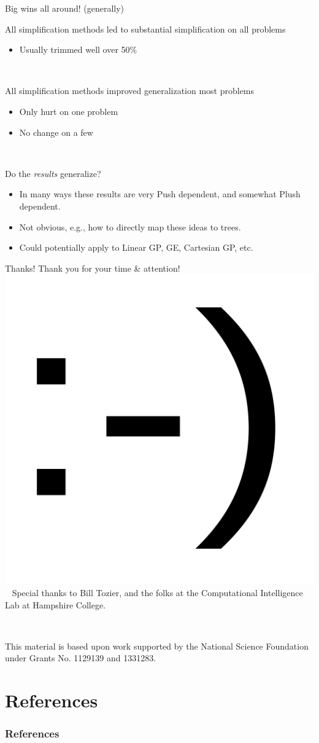 \documentclass{beamer}
\begin{document}
\begin{frame}{Big wins all around! (generally)}

All simplification methods led to substantial simplification on all problems
\begin{itemize}
	\item Usually trimmed well over 50\%
\end{itemize}

~

All simplification methods improved generalization most problems
\begin{itemize}
	\item Only hurt on one problem
	\item No change on a few
\end{itemize}

~

Do the \emph{results} generalize?
\begin{itemize}
	\item In many ways these results are very Push dependent, and somewhat Plush dependent.
	\item Not obvious, e.g., how to directly map these ideas to trees.
	\item Could potentially apply to Linear GP, GE, Cartesian GP, etc.
\end{itemize}


\end{frame}

\begin{frame}{Thanks!}
\center \Large
Thank you for your time \& attention! \\ \medskip
\includegraphics[width=.1\textwidth]{Illustrations/smile.png} \\ \medskip
\normalsize
~
Special thanks to Bill Tozier, and the folks at the Computational Intelligence Lab at Hampshire College.

~

This material is based upon work supported by the National Science Foundation under 
Grants No. 1129139 and 1331283.

\end{frame}


\section*{References}

\begin{frame}[allowframebreaks]
\frametitle{References}


\end{frame}
\end{document}
